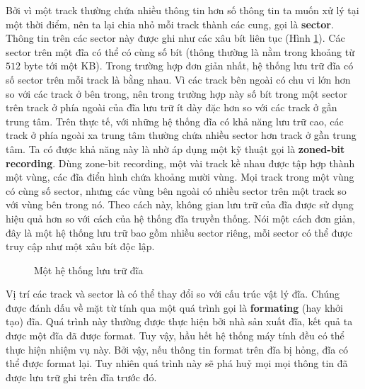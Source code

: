 Bởi vì một track thường chứa nhiều thông tin  hơn số thông tin ta muốn xử lý tại một thời điểm,
nên ta lại chia nhỏ mỗi track thành các cung, gọi là \textbf{sector}. Thông tin trên
các sector này được ghi như các xâu bít liên tục (Hình \ref{fig:fig1.9}). Các sector trên
một đĩa có thể có cùng số bít (thông thường là nằm trong khoảng từ $512$ byte tới một
KB). Trong trường hợp đơn giản nhất, hệ thống lưu trữ đĩa có số sector trên mỗi track là
bằng nhau. Vì các track bên ngoài có chu vi lớn hơn so với các track ở bên trong, nên
trong trường hợp này số bít trong một sector trên track ở phía ngoài của đĩa lưu trữ ít
dày đặc hơn so với các track ở gần trung tâm. Trên thực tế, với những hệ thống đĩa có khả
năng lưu trữ cao, các track ở phía ngoài xa trung tâm thường chứa nhiều sector hơn track ở
gần trung tâm. Ta có được khả năng này là nhờ áp dụng một kỹ thuật gọi là
\textbf{zoned-bit recording}. Dùng zone-bit recording, một vài track kề nhau được tập hợp
thành một vùng, các đĩa điển hình chứa khoảng mười vùng. Mọi track trong một vùng có cùng
số sector, nhưng các vùng bên ngoài có nhiều sector trên một track so với vùng bên trong
nó. Theo cách này, không gian lưu trữ của đĩa được sử dụng hiệu quả hơn so với cách của hệ
thống đĩa truyền thống. Nói một cách đơn giản, đây là một hệ thống lưu trữ bao gồm nhiều
sector riêng, mỗi sector có thể được truy cập như một xâu bít độc lập.

\begin{figure}[tb]
\centering
\caption{Một hệ thống lưu trữ đĩa}
  \label{fig:fig1.9}
\end{figure}

Vị trí các track và sector là có thể thay đổi so với cấu trúc vật lý
đĩa. Chúng được đánh dấu về mặt từ tính qua một quá trình gọi là \textbf{formating} (hay
khởi tạo) đĩa. Quá trình này thường được thực hiện bởi nhà sản xuất đĩa, kết quả ta được
một đĩa đã được format. Tuy vậy, hầu hết hệ thống máy tính đều có thể thực hiện nhiệm vụ
này. Bởi vậy, nếu thông tin format trên đĩa bị hỏng, đĩa có thể được format lại. Tuy nhiên
quá trình này sẽ phá huỷ mọi mọi thông tin đã được lưu trữ ghi trên đĩa trước đó.

